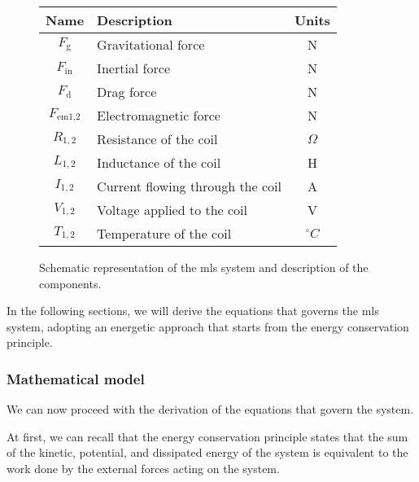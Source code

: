 \begin{figure}[H]
\begin{minipage}{0.55\textwidth}
        \begin{tabular}{|c|l|c|}
            \hline
            \textbf{Name}      & \textbf{Description}             & \textbf{Units} \\
            \hline
            $F_{\text{g}}$     & Gravitational force              & N              \\
            $F_{\text{in}}$    & Inertial force                   & N              \\
            $F_{\text{d}}$     & Drag force                       & N              \\
            $F_{\text{em1,2}}$ & Electromagnetic force            & N              \\
            $R_{1,2}$          & Resistance of the coil           & $\Omega$       \\
            $L_{1,2}$          & Inductance of the coil           & H              \\
            $I_{1,2}$          & Current flowing through the coil & A              \\
            $V_{1,2}$          & Voltage applied to the coil      & V              \\
            $T_{1,2}$          & Temperature of the coil          & $^\circ C$     \\
            \hline
        \end{tabular}

    \end{minipage}

    \caption{Schematic representation of the \acrshort{mls} system and description of the components.}
    \label{fig:system_model}
    \label{tab:components}

\end{figure}


In the following sections, we will derive the equations that governs the \acrshort{mls} system, adopting an energetic approach that starts from the energy conservation principle.

\subsubsection{Mathematical model}
\label{subsubsec:mathematical_model}

We can now proceed with the derivation of the equations that govern the system.

At first, we can recall that the energy conservation principle states that the sum of the kinetic, potential, and dissipated energy of the system is equivalent to the work done by the external forces acting on the system.

